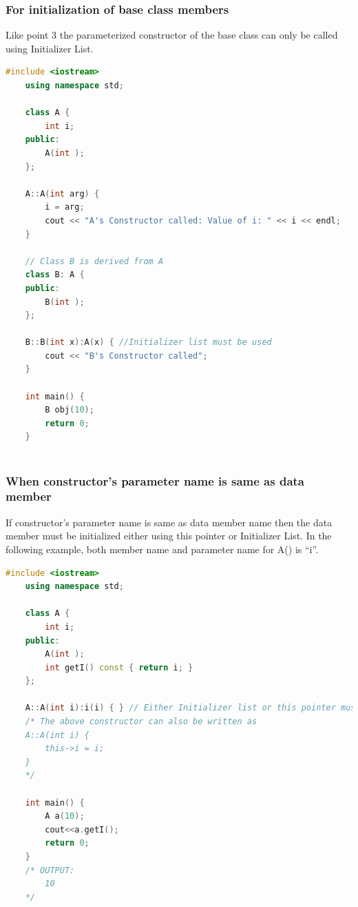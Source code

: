 \documentclass[12pt , a4paper]{article}
\begin{document}
	\subsubsection{For initialization of base class members}
	Like point 3 the parameterized constructor of the base class can only be called using Initializer List.\\
	\begin{lstlisting}[language=C++]
	#include <iostream>
	using namespace std;
	
	class A {
		int i;
	public:
		A(int );
	};
	
	A::A(int arg) {
		i = arg;
		cout << "A's Constructor called: Value of i: " << i << endl;
	}
	
	// Class B is derived from A
	class B: A {
	public:
		B(int );
	};
	
	B::B(int x):A(x) { //Initializer list must be used
		cout << "B's Constructor called";
	}
	
	int main() {
		B obj(10);
		return 0;
	}
	

	\end{lstlisting}
	\subsubsection{When constructor’s parameter name is same as data member}
	If constructor’s parameter name is same as data member name then the data member must be initialized either using this pointer or Initializer List. In the following example, both member name and parameter name for A() is “i”.\\
	\begin{lstlisting}[language=C++]
	#include <iostream>
	using namespace std;
	
	class A {
		int i;
	public:
		A(int );
		int getI() const { return i; }
	};
	
	A::A(int i):i(i) { } // Either Initializer list or this pointer must be used
	/* The above constructor can also be written as
	A::A(int i) {
		this->i = i;
	}
	*/
	
	int main() {
		A a(10);
		cout<<a.getI();
		return 0;
	}
	/* OUTPUT:
		10
	*/


	\end{lstlisting}
\end{document}
